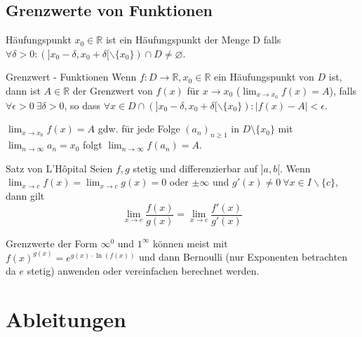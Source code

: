 \documentclass[a4paper,10pt]{article}
\def\limn{\lim_{n\to \infty}}
\def\R{\mathbb{R}}
\begin{document}
\subsection{Grenzwerte von Funktionen}
\begin{subbox}{Häufungspunkt}
 $x_0 \in \R$ ist ein Häufungspunkt der Menge D falls $\forall \delta > 0: (]x_0 - \delta, x_0 + \delta[ \backslash \{x_0\}) \cap D \ne \varnothing$.
\end{subbox}

\begin{mainbox}{Grenzwert - Funktionen}
 Wenn $f: D \to \R, x_0 \in \R$ ein Häufungspunkt von $D$ ist, dann ist $A \in \R$ der Grenzwert von $f(x)$ für $x \to x_0$ ($\lim_{x\to x_0} f(x) = A$), falls $\forall \epsilon > 0 \ \exists \delta > 0$, so dass $\forall x \in D \cap (]x_0 - \delta, x_0 + \delta[ \backslash \{x_0\}): |f(x) - A| < \epsilon$.
\end{mainbox}

$\lim_{x \rightarrow x_0} f(x) = A$ gdw. für jede Folge $(a_n)_{n \geq 1}$ in $D \setminus \{x_0\}$ mit $\limn a_n = x_0$ folgt $\limn f(a_n) = A$.

\begin{subbox}{Satz von L'Hôpital}
  Seien $f,g$ stetig und differenzierbar auf $]a,b[$. Wenn $\lim_{x\to c} f(x) = \lim_{x \to c} g(x) = 0$ oder $\pm \infty$ und $g'(x) \ne 0 \ \forall x \in I \backslash \{c\}$, dann gilt $$\lim_{x\to c} \frac{f(x)}{g(x)} = \lim_{x\to c}\frac{f'(x)}{g'(x)}$$
\end{subbox}

Grenzwerte der Form $\infty^0$ und $1^\infty$ können meist mit $f(x)^{g(x)} = e^{g(x)\cdot \ln(f(x))}$ und dann Bernoulli (nur Exponenten betrachten da $e$ stetig) anwenden oder vereinfachen berechnet werden.

\section{Ableitungen}
\end{document}

